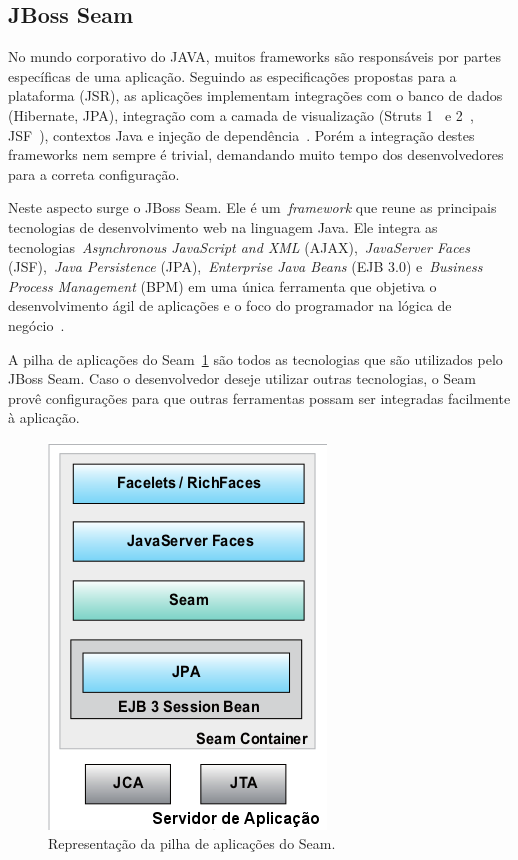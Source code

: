 \subsection{JBoss Seam}

No mundo corporativo do JAVA, muitos frameworks são responsáveis por partes específicas de uma aplicação. Seguindo as especificações propostas para a plataforma (JSR), as aplicações implementam integrações com o banco de dados (Hibernate, JPA), integração com a camada de visualização (Struts 1~\cite{struts1} e 2~\cite{struts2}, JSF~\cite{jsf2012}), contextos Java e injeção de dependência~\cite{di2012}. Porém a integração destes frameworks nem sempre é trivial, demandando muito tempo dos desenvolvedores para a correta configuração.

Neste aspecto surge o JBoss Seam. Ele é um~\emph{framework} que reune as principais tecnologias de desenvolvimento web na linguagem Java. Ele integra as tecnologias~\emph{Asynchronous JavaScript and XML} (AJAX),~\emph{JavaServer Faces} (JSF),~\emph{Java Persistence} (JPA),~\emph{Enterprise Java Beans} (EJB 3.0) e~\emph{Business Process Management} (BPM) em uma única ferramenta que objetiva o desenvolvimento ágil de aplicações e o foco do programador na lógica de negócio~\cite{seamSite}.

A pilha de aplicações do Seam~\ref{fig:servidor-app-seam} são todos as tecnologias que são utilizados pelo JBoss Seam. Caso o desenvolvedor deseje utilizar outras tecnologias, o Seam provê configurações para que outras ferramentas possam ser integradas facilmente à aplicação.

\begin{figure}
	\centering
	\includegraphics[scale=0.65]{images/servidor-app-seam.png}
	\caption{Representação da pilha de aplicações do Seam.~\cite{allen09}}
	\label{fig:servidor-app-seam}
\end{figure}


